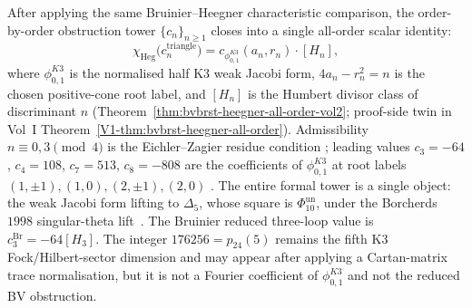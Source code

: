\begin{remark}
\label{rem:htbb-core-heegner-pattern}
After applying the same Bruinier--Heegner characteristic comparison, the
order-by-order obstruction tower $\{c_n\}_{n\geq 1}$ closes into a
single all-order scalar identity:
\[
\chi_{\mathrm{Heg}}\bigl(c_n^{\mathrm{triangle}}\bigr)
= c_{\phi_{0,1}^{K3}}(a_n,r_n)\cdot [H_n],
\]
where
\(\phi_{0,1}^{K3}\) is the normalised half K3 weak Jacobi form,
\(4a_n-r_n^2=n\) is the chosen positive-cone root label, and $[H_n]$ is
the Humbert divisor class of discriminant $n$
\textup{(}Theorem~\ref{thm:bvbrst-heegner-all-order-vol2}; proof-side
twin in Vol~I
Theorem~\ref*{V1-thm:bvbrst-heegner-all-order}\textup{).} Admissibility
$n\equiv 0, 3\pmod 4$ is the Eichler--Zagier residue condition
\cite[Theorem 9.3]{EichlerZagier1985}; leading values \(c_3=-64\),
\(c_4=108\), \(c_7=513\), \(c_8=-808\) are the coefficients of
\(\phi_{0,1}^{K3}\) at root labels \((1,\pm1),(1,0),(2,\pm1),(2,0)\)
\cite[Table 1]{EichlerZagier1985}. The entire formal tower is a single
object: the weak Jacobi form lifting to \(\Delta_5\), whose square is
\(\Phi_{10}^{\mathrm{un}}\), under the
Borcherds~$1998$ singular-theta
lift~\cite[Theorem 10.1]{Borcherds1998}. The Bruinier reduced
three-loop value is \(c^{\mathrm{Br}}_3=-64[H_3]\). The integer
$176256=p_{24}(5)$ remains the fifth K3 Fock/Hilbert-sector dimension
and may appear after applying a Cartan-matrix trace normalisation, but
it is not a Fourier coefficient of \(\phi_{0,1}^{K3}\) and not the reduced
BV obstruction.
\end{remark}
